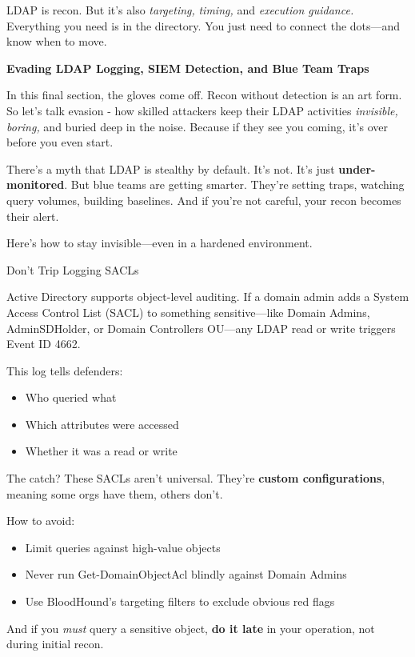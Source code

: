 LDAP is recon. But it’s also \textit{targeting,} \textit{timing,} and \textit{execution guidance.} Everything you need is in the directory. You just need to connect the dots—and know when to move.

\textbf{Evading LDAP Logging, SIEM Detection, and Blue Team Traps}

In this final section, the gloves come off. Recon without detection is an art form. So let’s talk evasion - how skilled attackers keep their LDAP activities \textit{invisible, boring, }and buried deep in the noise. Because if they see you coming, it’s over before you even start.

There’s a myth that LDAP is stealthy by default. It’s not. It’s just \textbf{under-monitored}. But blue teams are getting smarter. They’re setting traps, watching query volumes, building baselines. And if you’re not careful, your recon becomes their alert.

Here’s how to stay invisible—even in a hardened environment.

Don’t Trip Logging SACLs

Active Directory supports object-level auditing. If a domain admin adds a System Access Control List (SACL) to something sensitive—like Domain Admins, AdminSDHolder, or Domain Controllers OU—any LDAP read or write triggers Event ID 4662.

This log tells defenders:

\begin{itemize}
    \item Who queried what

    \item Which attributes were accessed

    \item Whether it was a read or write

\end{itemize}
The catch? These SACLs aren’t universal. They’re \textbf{custom configurations}, meaning some orgs have them, others don’t.

How to avoid:

\begin{itemize}
    \item Limit queries against high-value objects

    \item Never run Get-DomainObjectAcl blindly against Domain Admins

    \item Use BloodHound’s targeting filters to exclude obvious red flags

\end{itemize}
And if you \textit{must} query a sensitive object, \textbf{do it late} in your operation, not during initial recon.

